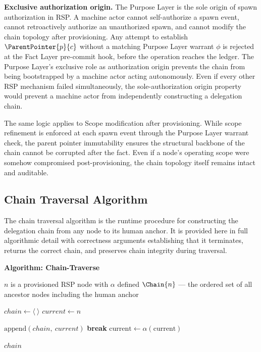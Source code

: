\medskip
\noindent\textbf{Exclusive authorization origin.} The Purpose Layer is the sole origin of spawn authorization in RSP. A machine actor cannot self-authorize a spawn event, cannot retroactively authorize an unauthorized spawn, and cannot modify the chain topology after provisioning. Any attempt to establish $\ParentPointer{p}{c}$ without a matching Purpose Layer warrant $\phi$ is rejected at the Fact Layer pre-commit hook, before the operation reaches the ledger. The Purpose Layer's exclusive role as authorization origin prevents the chain from being bootstrapped by a machine actor acting autonomously. Even if every other RSP mechanism failed simultaneously, the sole-authorization origin property would prevent a machine actor from independently constructing a delegation chain.

The same logic applies to Scope modification after provisioning. While scope refinement is enforced at each spawn event through the Purpose Layer warrant check, the parent pointer immutability ensures the structural backbone of the chain cannot be corrupted after the fact. Even if a node's operating scope were somehow compromised post-provisioning, the chain topology itself remains intact and auditable.

\subsection{Chain Traversal Algorithm}
\label{sec:chain-traversal}

The chain traversal algorithm is the runtime procedure for constructing the delegation chain from any node to its human anchor. It is provided here in full algorithmic detail with correctness arguments establishing that it terminates, returns the correct chain, and preserves chain integrity during traversal.

\medskip
\noindent\textbf{Algorithm: Chain-Traverse}

\begin{algorithm}
\caption{Chain-Traverse($n$) --- Build the delegation chain from node $n$ to the human anchor}
\label{alg:chain-traverse}
\begin{algorithmic}[1]
\REQUIRE $n$ is a provisioned RSP node with $\alpha$ defined
\ENSURE $\Chain{n}$ --- the ordered set of all ancestor nodes including the human anchor

\STATE $chain \leftarrow \langle\ \rangle$ 
\STATE $current \leftarrow n$ 

    \STATE $\text{append}(chain,\ current)$ 
        \STATE \textbf{break} 
    \ENDIF
    \STATE $\text{current} \leftarrow \alpha(\text{current})$ 
\ENDWHILE

\RETURN $chain$
\end{algorithmic}
\end{algorithm}

